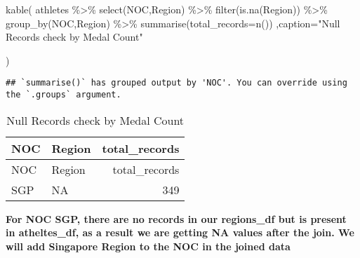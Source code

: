 \documentclass[
]{article}
\newenvironment{Shaded}{\begin{snugshade}}{\end{snugshade}}
\newcommand{\AttributeTok}[1]{\textcolor[rgb]{0.77,0.63,0.00}{#1}}
\newcommand{\FunctionTok}[1]{\textcolor[rgb]{0.00,0.00,0.00}{#1}}
\newcommand{\NormalTok}[1]{#1}
\newcommand{\OtherTok}[1]{\textcolor[rgb]{0.56,0.35,0.01}{#1}}
\newcommand{\SpecialCharTok}[1]{\textcolor[rgb]{0.00,0.00,0.00}{#1}}
\newcommand{\StringTok}[1]{\textcolor[rgb]{0.31,0.60,0.02}{#1}}
\begin{document}
\begin{Shaded}
\begin{Highlighting}[]
\FunctionTok{kable}\NormalTok{(}
\NormalTok{  athletes }\SpecialCharTok{\%\textgreater{}\%}
    \FunctionTok{select}\NormalTok{(NOC,Region)  }\SpecialCharTok{\%\textgreater{}\%}
    \FunctionTok{filter}\NormalTok{(}\FunctionTok{is.na}\NormalTok{(Region)) }\SpecialCharTok{\%\textgreater{}\%}
    \FunctionTok{group\_by}\NormalTok{(NOC,Region) }\SpecialCharTok{\%\textgreater{}\%}
    \FunctionTok{summarise}\NormalTok{(}\AttributeTok{total\_records=}\FunctionTok{n}\NormalTok{())}
\NormalTok{    ,}\AttributeTok{caption=}\StringTok{"Null Records check by Medal Count"}
  
\NormalTok{)}
\end{Highlighting}
\end{Shaded}

\begin{verbatim}
## `summarise()` has grouped output by 'NOC'. You can override using the `.groups` argument.
\end{verbatim}

\begin{longtable}[]{@{}llr@{}}
\caption{Null Records check by Medal Count}\tabularnewline
\toprule
NOC & Region & total\_records \\
\midrule
\endfirsthead
\toprule
NOC & Region & total\_records \\
\midrule
\endhead
SGP & NA & 349 \\
\bottomrule
\end{longtable}

\textbf{For NOC SGP, there are no records in our regions\_df but is
present in atheltes\_df, as a result we are getting NA values after the
join. We will add Singapore Region to the NOC in the joined data}

\begin{Shaded}
\end{Shaded}
\end{document}
